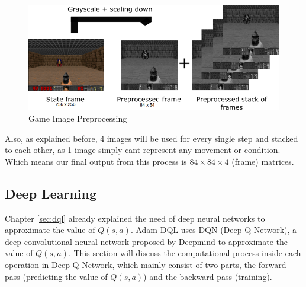     \begin{figure}[H]
        \centering
        \includegraphics[scale=0.5]{images/preprocessing.png}
        \caption{Game Image Preprocessing}
        \label{fig:44}
    \end{figure}
    
    Also, as explained before, 4 images will be used for every single step and stacked to each other, as 1 image simply cant represent any movement or condition. Which means our final output from this process is  $84 \times 84 \times 4$ (frame)  matrices.
        
    \subsection{Deep Learning}
    Chapter \ref{sec:dql} already explained the need of deep neural networks to approximate the value of $Q(s,a)$. Adam-DQL uses DQN (Deep Q-Network), a deep convolutional neural network proposed by Deepmind to approximate the value of $Q(s,a)$. This section will discuss the computational process inside each operation in Deep Q-Network, which mainly consist of two parts, the forward pass (predicting the value of $Q(s,a)$) and the backward pass (training).
